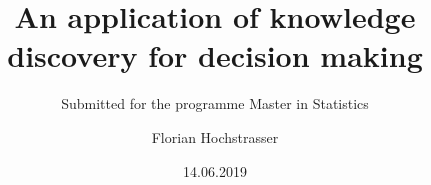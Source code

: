 \begin{titlepage}

\titlehead{Master Thesis}
\subject{Profit maximisation for direct marketing campaigns}
\title{An application of knowledge discovery for decision making}
\subtitle{Submitted for the programme Master in Statistics}
\author{Florian Hochstrasser}
\date{14.06.2019}
\publishers{Supervisor: Jacques Zuber}
\extratitle{ }
\uppertitleback{Obiger Titelrückentitel}
\lowertitleback{Für dieses Beispiel wird keine Haftung übernommen.}
\dedication{Dieses Beispiel widme ich\\allen LaTeX Usern}

\end{titlepage}
